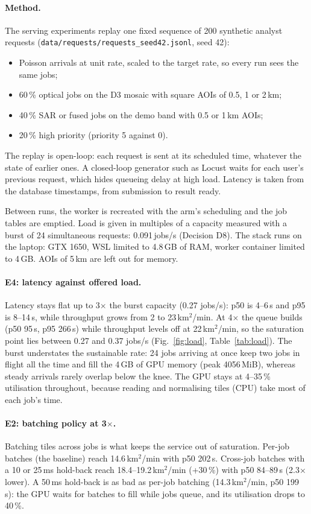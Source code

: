 \paragraph{Method.} The serving experiments replay one fixed sequence of 200 synthetic analyst
requests (\texttt{data/requests/requests\_seed42.jsonl}, seed 42):
\begin{itemize}
\item Poisson arrivals at unit rate, scaled to the target rate, so every run sees the same jobs;
\item 60\,\% optical jobs on the D3 mosaic with square AOIs of 0.5, 1 or 2\,km;
\item 40\,\% SAR or fused jobs on the demo band with 0.5 or 1\,km AOIs;
\item 20\,\% high priority (priority 5 against 0).
\end{itemize}
The replay is open-loop: each request is sent at its scheduled time, whatever the state of
earlier ones. A closed-loop generator such as Locust waits for each user's previous
request, which hides queueing delay at high load. Latency is taken from the database
timestamps, from submission to result ready.

Between runs, the worker is recreated with the arm's scheduling and the job tables are
emptied. Load is given in multiples of a capacity measured with a burst of 24 simultaneous
requests: 0.091\,jobs/s (Decision D8). The stack runs on the laptop: GTX 1650, WSL limited
to 4.8\,GB of RAM, worker container limited to 4\,GB. AOIs of 5\,km are left out for memory.

\paragraph{E4: latency against offered load.}
Latency stays flat up to 3$\times$ the burst capacity (0.27 jobs/s): p50 is 4--6\,s and
p95 is 8--14\,s, while throughput grows from 2 to 23\,km$^2$/min. At 4$\times$ the queue
builds (p50 95\,s, p95 266\,s) while throughput levels off at 22\,km$^2$/min, so the
saturation point lies between 0.27 and 0.37 jobs/s (Fig.~\ref{fig:load},
Table~\ref{tab:load}). The burst understates the sustainable rate: 24 jobs arriving at
once keep two jobs in flight all the time and fill the 4\,GB of GPU memory (peak
4056\,MiB), whereas steady arrivals rarely overlap below the knee. The GPU stays at
4--35\,\% utilisation throughout, because reading and normalising tiles (CPU) take most of
each job's time.

\paragraph{E2: batching policy at 3$\times$.}
Batching tiles across jobs is what keeps the service out of saturation. Per-job batches
(the baseline) reach 14.6\,km$^2$/min with p50 202\,s. Cross-job batches with a 10 or
25\,ms hold-back reach 18.4--19.2\,km$^2$/min (+30\,\%) with p50 84--89\,s
(2.3$\times$ lower). A 50\,ms hold-back is as bad as per-job batching (14.3\,km$^2$/min,
p50 199\,s): the GPU waits for batches to fill while jobs queue, and its utilisation drops
to 40\,\%.

